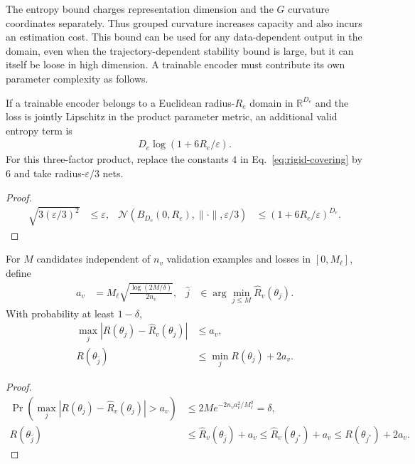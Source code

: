 The entropy bound charges representation dimension and the $G$ curvature coordinates separately. Thus grouped curvature increases capacity and also incurs an estimation cost. This bound can be used for any data-dependent output in the domain, even when the trajectory-dependent stability bound is large, but it can itself be loose in high dimension. A trainable encoder must contribute its own parameter complexity as follows.

\begin{corollary}
If a trainable encoder belongs to a Euclidean radius-$R_e$ domain in $\mathbb R^{D_e}$ and the loss is jointly Lipschitz in the product parameter metric, an additional valid entropy term is
\begin{align}
 D_e\log(1+6R_e/\varepsilon).
\end{align}
For this three-factor product, replace the constants $4$ in Eq.~\eqref{eq:rigid-covering} by $6$ and take radius-$\varepsilon/3$ nets.
\end{corollary}
\begin{proof}
\begin{align}
 \sqrt{3(\varepsilon/3)^2}&\le\varepsilon,&
 \mathcal N(B_{D_e}(0,R_e),\|\cdot\|,\varepsilon/3)
 &\le(1+6R_e/\varepsilon)^{D_e}.
\end{align}
\end{proof}

\begin{proposition}
For $M$ candidates independent of $n_v$ validation examples and losses in $[0,M_\ell]$, define
\begin{align}
 a_v&=M_\ell\sqrt{\frac{\log(2M/\delta)}{2n_v}},&
 \widehat j&\in\arg\min_{j\le M}\widehat R_v(\theta_j).
\end{align}
With probability at least $1-\delta$,
\begin{align}
 \max_j|R(\theta_j)-\widehat R_v(\theta_j)|&\le a_v,\\
 R(\theta_{\widehat j})&\le\min_jR(\theta_j)+2a_v.
\end{align}
\end{proposition}
\begin{proof}
\begin{align}
 \Pr\left(\max_j|R(\theta_j)-\widehat R_v(\theta_j)|>a_v\right)
 &\le2M e^{-2n_va_v^2/M_\ell^2}=\delta,\\
 R(\theta_{\widehat j})
 &\le\widehat R_v(\theta_{\widehat j})+a_v
 \le\widehat R_v(\theta_{j^*})+a_v
 \le R(\theta_{j^*})+2a_v.
\end{align}
\end{proof}

